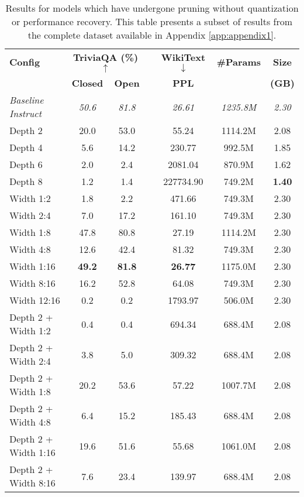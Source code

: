 {\begin{table}[!htbp]
\centering
\footnotesize
\caption[Results for Pruning-Only Configurations (Subset)]{Results for models which have undergone pruning without quantization or performance recovery. This table presents a subset of results from the complete dataset available in Appendix \ref{app:appendix1}.} \label{tab:pruning_only_results}
\label{tab:depth_pruning_results}
\begin{tabular}{lcccccc}
\hline
\textbf{Config} & \multicolumn{2}{c}{\textbf{TriviaQA (\%) $\uparrow$}} & & \textbf{WikiText $\downarrow$} & \textbf{\#Params} & \textbf{Size} \\
\cline{2-3}
& \textbf{Closed} & \textbf{Open} & & \textbf{PPL} & & \textbf{(GB)} \\
\hline
\textit{Baseline Instruct} & \textit{50.6} & \textit{81.8} & & \textit{26.61} & \textit{1235.8M} & \textit{2.30} \\
Depth 2 & 20.0 & 53.0 & & 55.24 & 1114.2M & 2.08 \\
Depth 4 & 5.6 & 14.2 & & 230.77 & 992.5M & 1.85 \\
Depth 6 & 2.0 & 2.4 & & 2081.04 & 870.9M & 1.62 \\
Depth 8 & 1.2 & 1.4 & & 227734.90 & 749.2M & \textbf{1.40} \\
Width 1:2 & 1.8 & 2.2 & & 471.66 & 749.3M & 2.30 \\
Width 2:4 & 7.0 & 17.2 & & 161.10 & 749.3M & 2.30 \\
Width 1:8 & 47.8 & 80.8 & & 27.19 & 1114.2M & 2.30 \\
Width 4:8 & 12.6 & 42.4 & & 81.32 & 749.3M & 2.30 \\
Width 1:16 & \textbf{49.2} & \textbf{81.8} & & \textbf{26.77} & 1175.0M & 2.30 \\
Width 8:16 & 16.2 & 52.8 & & 64.08 & 749.3M & 2.30 \\
Width 12:16 & 0.2 & 0.2 & & 1793.97 & 506.0M & 2.30 \\
Depth 2 + Width 1:2 & 0.4 & 0.4 & & 694.34 & 688.4M & 2.08 \\
Depth 2 + Width 2:4 & 3.8 & 5.0 & & 309.32 & 688.4M & 2.08 \\
Depth 2 + Width 1:8 & 20.2 & 53.6 & & 57.22 & 1007.7M & 2.08 \\
Depth 2 + Width 4:8 & 6.4 & 15.2 & & 185.43 & 688.4M & 2.08 \\
Depth 2 + Width 1:16 & 19.6 & 51.6 & & 55.68 & 1061.0M & 2.08 \\
Depth 2 + Width 8:16 & 7.6 & 23.4 & & 139.97 & 688.4M & 2.08 \\

\end{tabular}
\end{table}}
